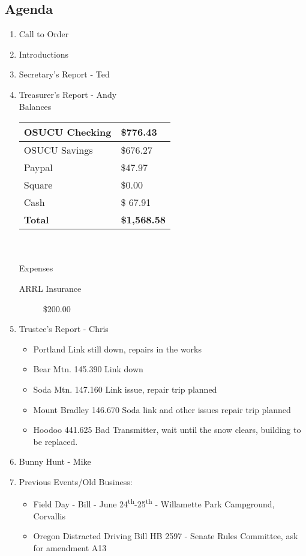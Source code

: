 \documentclass[letter,11pt]{extarticle}
\begin{document}
	\subsection*{Agenda}
	\begin{enumerate}
		\item Call to Order
		\item Introductions
		\item Secretary's Report - Ted
		\item Treasurer's Report - Andy \\
				Balances \\
			\begin{tabular}{|l|l|} \hline
				OSUCU Checking & \$776.43 \\ \hline
				OSUCU Savings & \$676.27 \\ \hline
				Paypal & \$47.97 \\ \hline
				Square & \$0.00 \\ \hline
				Cash & \$ 67.91 \\ \hline
				\textbf{Total} & \textbf{\$1,568.58} \\ \hline
			\end{tabular} \\ \\
			Expenses
			\begin{description}
				\item[ARRL Insurance] \$200.00
			\end{description}
		\item Trustee's Report - Chris
			\begin{itemize}
				\item Portland Link still down, repairs in the works
				\item Bear Mtn. 145.390 Link down
				\item Soda Mtn. 147.160 Link issue, repair trip planned
				\item Mount Bradley 146.670 Soda link and other issues repair trip planned
				\item Hoodoo 441.625 Bad Transmitter, wait until the snow clears, building to be replaced.		
			\end{itemize}
		\item Bunny Hunt - Mike
		\item Previous Events/Old Business:
			\begin{itemize}
				\item Field Day - Bill - June 24\textsuperscript{th}-25\textsuperscript{th} - Willamette Park Campground, Corvallis
				\item Oregon Distracted Driving Bill HB 2597 - Senate Rules Committee, ask for amendment A13

\end{itemize}
\end{enumerate}
\end{document}
